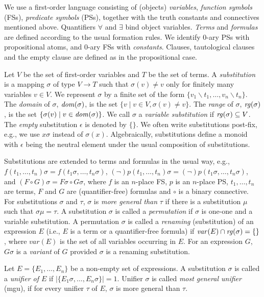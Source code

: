 \documentclass{llncs}
\newcommand{\dom}[1]{\ensuremath\mathit{dom}(#1)}
\newcommand{\range}[1]{\ensuremath\mathit{rg}(#1)}
\newcommand{\var}[1]{\mathit{var}(#1)}
\newcommand{\card}[1]{\left\vert{#1}\right\vert}
\begin{document}
We use a first-order language consisting of (objects) {\em variables},
\emph{function symbols} (FSs), \emph{predicate symbols} (PSs),
together with the truth constants and connectives mentioned above.
Quantifiers $\forall$ and $\exists$ bind object variables.  \emph{
  Terms} and \emph{formulas} are defined according to the usual
formation rules.  We identify $0$-ary PSs with
propositional atoms, and $0$-ary FSs with
\emph{constants}. Clauses, tautological clauses and the empty clause
are defined as in the propositional case.

Let $V$ be the set of first-order variables and $T$ be the set of
terms.  A \emph{substitution} is a mapping $\sigma$ of type
$V\rightarrow T$ such that $\sigma(v) \neq v$ only for finitely many
variables $v\in V$.  We represent $\sigma$ by a finite set of the form
$\{v_1\backslash t_1, \ldots , v_n \backslash t_n\}$.  The
\emph{domain} of 
$\sigma$, $\dom{\sigma}$, is the set
$\{v \mid v\in V, \sigma(v) \neq v\}$. The \emph{range} of $\sigma$,
$\range{\sigma}$, is the set $\{\sigma(v) \mid v\in
\dom{\sigma}\}$. We call $\sigma$ a \emph{variable substitution} if
$\range{\sigma} \subseteq V$.  The \emph{empty} substitution
$\epsilon$ is denoted by $\{\}$. We often write substitutions
post-fix, e.g., we use $x\sigma$ instead of $\sigma(x)$.
Algebraically, substitutions define a monoid with $\epsilon$ being the
neutral element under the usual composition of substitutions.

Substitutions are extended to terms and formulas in the usual way,
e.g., $f(t_1,\ldots , t_n)\sigma = f(t_1\sigma,\ldots , t_n\sigma)$,
$(\neg) p(t_1,\ldots , t_n)\sigma = (\neg) p(t_1\sigma,\ldots ,
t_n\sigma)$, and $(F\circ G)\sigma = F\sigma \circ G\sigma$, where $f$
is an $n$-place FS, $p$ is an $n$-place PS, $t_1, \ldots , t_n$ are
terms, $F$ and $G$ are (quantifier-free) formulas and $\circ$ is a
binary connective.  For substitutions $\sigma$ and $\tau$, $\sigma$ is
\emph{more general than} $\tau$ if there is a substitution $\mu$ such
that $\sigma\mu = \tau$.
A substitution $\sigma$ is called a \emph{permutation} if $\sigma$ is
one-one and a variable substitution. A permutation $\sigma$ is called
a \emph{renaming} (substitution) of an expression $E$ (i.e., $E$ is a
term or a quantifier-free formula) if $\var{E}\cap \range{\sigma} =
\{\}$, where $\var{E}$ is the set of all variables occurring in $E$.
For an expression $G$, $G\sigma$ is a \emph{variant} of $G$ provided
$\sigma$ is a renaming substitution.

Let $E=\{E_1, \ldots , E_n\}$ be a non-empty set of expressions. A
substitution $\sigma$ is called a \emph{unifier of $E$} if
$\card{\{E_1\sigma, \ldots , E_n\sigma\}} = 1$. Unifier $\sigma$ is
called \emph{most general unifier} (mgu), if for every unifier $\tau$
of $E$, $\sigma$ is more general than $\tau$.
\end{document}
